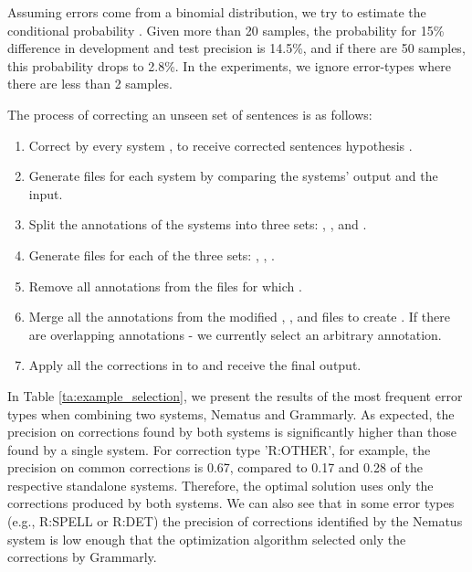 \documentclass[11pt,a4paper]{article}
\begin{document}
Assuming errors come from a binomial distribution, we try to estimate the conditional probability 
 .
 Given more than 20 samples, the probability for 15\% difference in development and test precision is 14.5\%, and if there are 50 samples, this probability drops to 2.8\%.
 In the experiments, we ignore error-types where there are less than 2 samples.

 The process of correcting an unseen set of sentences  is as follows:
\begin{enumerate}
\item Correct  by every system , to receive corrected sentences hypothesis  .
 \item Generate  files for each system by comparing the systems' output  and the  input. 
 \item Split the annotations of the systems into three sets:   ,  , and  .
 \item Generate  files for each of the three sets: , , .
 \item Remove all annotations from the  files for which  .
 \item Merge all the annotations from the modified , , and  files to create . If there are overlapping annotations - we currently select an arbitrary annotation.
 \item Apply all the corrections in  to  and receive the final output.
\end{enumerate}

In Table \ref{ta:example_selection}, we present the results of the most frequent error types when combining two systems, Nematus and Grammarly.
As expected, the precision on corrections found by both systems is significantly higher than those found by a single system.   For correction type 'R:OTHER', for example, the precision on common corrections is 0.67, compared to 0.17 and 0.28 of the respective standalone systems. Therefore, the optimal solution uses only the corrections produced by both systems. 
We can also see that in some error types (e.g., R:SPELL or R:DET) the precision of  corrections identified by the Nematus system is low enough that the optimization algorithm selected only the corrections by Grammarly.
\end{document}
